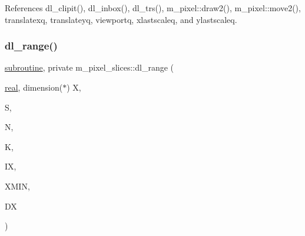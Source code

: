 References dl\+\_\+clipit(), dl\+\_\+inbox(), dl\+\_\+trs(), m\+\_\+pixel\+::draw2(), m\+\_\+pixel\+::move2(), translatexq, translateyq, viewportq, xlastscaleq, and ylastscaleq.

\mbox{\label{namespacem__pixel__slices_a47408b6c6411a3c3cb3419b319e57978}} 
\subsubsection{\texorpdfstring{dl\+\_\+range()}{dl\_range()}}
{\footnotesize\ttfamily \hyperlink{M__stopwatch_83_8txt_acfbcff50169d691ff02d4a123ed70482}{subroutine}, private m\+\_\+pixel\+\_\+slices\+::dl\+\_\+range (\begin{DoxyParamCaption}\item[{\hyperlink{read__watch_83_8txt_abdb62bde002f38ef75f810d3a905a823}{real}, dimension($\ast$)}]{X,  }\item[{}]{S,  }\item[{}]{N,  }\item[{}]{K,  }\item[{}]{IX,  }\item[{}]{X\+M\+IN,  }\item[{}]{DX }\end{DoxyParamCaption})\hspace{0.3cm}{\ttfamily [private]}}

\mbox{\label{namespacem__pixel__slices_ac9e60bae24d6a1525af0da041bc1cf55}} 
